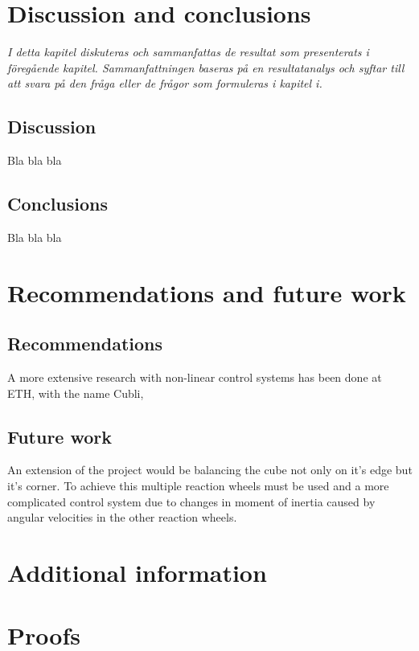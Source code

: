 \documentclass[a4paper,11pt]{kth-mag}
\begin{document}
\chapter{Discussion and conclusions}
\emph{I detta kapitel diskuteras och sammanfattas de resultat som presenterats i föregående kapitel. Sammanfattningen baseras på en resultatanalys och syftar till att svara på den fråga eller de frågor som formuleras i kapitel i.}

\section{Discussion}
Bla bla bla

\section{Conclusions}
Bla bla bla


\chapter{Recommendations and future work}

\section{Recommendations}
A more extensive research with non-linear control systems has been done at ETH, with the name Cubli,\cite{cubliECC13}

\section{Future work}
An extension of the project would be balancing the cube not only on it's edge but it's corner. To achieve this multiple reaction wheels must be used and a more complicated control system due to changes in moment of inertia caused by angular velocities in the other reaction wheels.

%
\cleardoublepage


\cleardoublepage
\appendix
{}


\chapter{Additional information} \label{appA}

\chapter{Proofs} \label{appB}

\cleardoublepage   
\cleartoverso %
%

\end{document}
